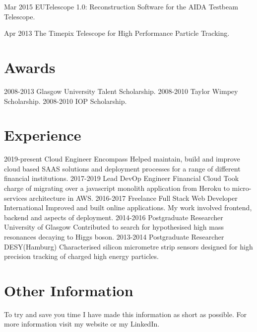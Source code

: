 \documentclass[]{twentysecondcv}
\begin{document}
\begin{twentyshort}
  \twentyitemshort
    {Mar 2015}
    {EUTelescope 1.0: Reconstruction Software for the AIDA Testbeam Telescope.}
\end{twentyshort}

\begin{twentyshort}
  \twentyitemshort
    {Apr 2013}
    {The Timepix Telescope for High Performance Particle Tracking.}
\end{twentyshort}




\section*{Awards}

\begin{twentyshort}
  \twentyitemshort
    {2008-2013}
    {Glasgow University Talent Scholarship.}
  \twentyitemshort
    {2008-2010}
    {Taylor Wimpey Scholarship.}
  \twentyitemshort
    {2008-2010}
    {IOP Scholarship.}
\end{twentyshort}


\section*{Experience}

\begin{twenty}
  \twentyitem
  {2019-present}
  {Cloud Engineer}
  {Encompass}
  {Helped maintain, build and improve cloud based SAAS solutions and deployment processes for a range of different financial institutions.}
  \twentyitem
  {2017-2019}
  {Lead DevOp Engineer}
  {Financial Cloud}
  {Took charge of migrating over a javascript monolith application from Heroku to micro-services architecture in AWS.}
  \twentyitem
    {2016-2017}
    {Freelance Full Stack Web Developer}
    {International}
    {Improved and built online applications. My work involved frontend, backend and aspects of deployment.}
  \twentyitem
    {2014-2016}
    {Postgraduate Researcher}
    {University of Glasgow}
    {Contributed to search for hypothesised high mass resonances decaying to Higgs boson.}
\twentyitem
    {2013-2014}
    {Postgraduate Researcher}
		{DESY(Hamburg)}
    {Characterised silicon micrometre strip sensors designed for high precision tracking of charged high energy particles.}

\end{twenty}
\section*{Other Information}
\hspace*{5pt}
To try and save you time I have made this information as short as possible. For more information visit my website or my LinkedIn.
\hspace*{5pt}
\vspace*{2pt}

\end{document}
